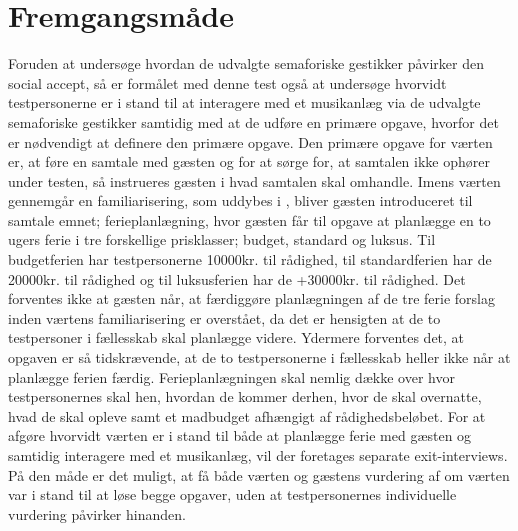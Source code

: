 \section{Fremgangsmåde}
\label{FremgangsmaadeSocialAccept}
%
Foruden at undersøge hvordan de udvalgte semaforiske gestikker påvirker den social accept, så er formålet med denne test også at undersøge hvorvidt testpersonerne er i stand til at interagere med et musikanlæg via de udvalgte semaforiske gestikker samtidig med at de udføre en primære opgave, hvorfor det er nødvendigt at definere den primære opgave. Den primære opgave for værten er, at føre en samtale med gæsten og for at sørge for, at samtalen ikke ophører under testen, så instrueres gæsten i hvad samtalen skal omhandle. Imens værten gennemgår en familiarisering, som uddybes i , bliver gæsten introduceret til samtale emnet; ferieplanlægning, hvor gæsten får til opgave at planlægge en to ugers ferie i tre forskellige prisklasser; budget, standard og luksus. Til budgetferien har testpersonerne 10000kr. til rådighed, til standardferien har de 20000kr. til rådighed og til luksusferien har de +30000kr. til rådighed. Det forventes ikke at gæsten når, at færdiggøre planlægningen af de tre ferie forslag inden værtens familiarisering er overstået, da det er hensigten at de to testpersoner i fællesskab skal planlægge videre. Ydermere forventes det, at opgaven er så tidskrævende, at de to testpersonerne i fællesskab heller ikke når at planlægge ferien færdig. Ferieplanlægningen skal nemlig dække over hvor testpersonernes skal hen, hvordan de kommer derhen, hvor de skal overnatte, hvad de skal opleve samt et madbudget afhængigt af rådighedsbeløbet. For at afgøre hvorvidt værten er i stand til både at planlægge ferie med gæsten og samtidig interagere med et musikanlæg, vil der foretages separate exit-interviews. På den måde er det muligt, at få både værten og gæstens vurdering af om værten var i stand til at løse begge opgaver, uden at testpersonernes individuelle vurdering påvirker hinanden. \blankline
%
